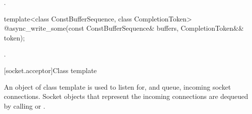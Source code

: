 \begin{itemdescr}
\pnum
\returns {}.
\end{itemdescr}

\begin{itemdecl}
template<class ConstBufferSequence, class CompletionToken>
  @\DEDUCED@ async_write_some(const ConstBufferSequence& buffers,
                           CompletionToken&& token);
\end{itemdecl}

\begin{itemdescr}
\pnum
\returns {}.
\end{itemdescr}




%
[socket.acceptor]{Class template }

\pnum
An object of class template  is used to listen for, and queue, incoming socket connections. Socket objects that represent the incoming connections are dequeued by calling  or .

